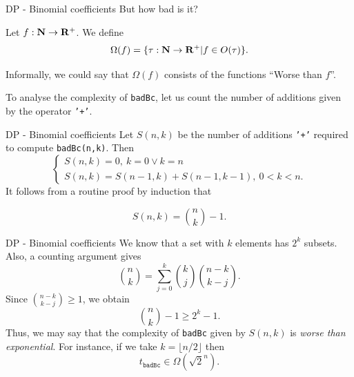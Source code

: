 \documentclass{beamer}
\begin{document}
%

\begin{frame}{DP - Binomial coefficients}
	But how bad is it?
	\begin{defn}
		Let $f : \mathbf{N} \to \mathbf{R}^+$. We define
		\[
			\Omega(f)= \{\tau : \mathbf{N} \to \mathbf{R}^+ | f \in O(\tau)\}.
		\]
	\end{defn}
	Informally, we could say that $\Omega(f)$ consists of the functions
	``Worse than $f$''.

	\bigskip
	To analyse the complexity of \texttt{badBc}, let us count the number of
	additions given by the operator \texttt{'+'}.
\end{frame}

%

\begin{frame}{DP - Binomial coefficients}
	Let $S(n,k)$ be the number of additions \texttt{'+'} required to compute
	\texttt{badBc(n,k)}. Then
	\[
		\begin{cases}
			S(n,k) = 0,\ k = 0 \lor k = n\\
			S(n,k) = S(n-1,k) + S(n-1,k-1),\ 0 < k < n.
		\end{cases}
	\]
	It follows from a routine proof by induction that
	\begin{prop}
		\[
			S(n,k) = \binom{n}{k} - 1.
		\]
	\end{prop}
\end{frame}

%

\begin{frame}{DP - Binomial coefficients}
	We know that a set with $k$ elements has $2^k$ subsets. Also, a counting
	argument gives
	\[
		\binom{n}{k} = \sum_{j= 0}^k \binom{k}{j} \binom{n-k}{k-j}.
	\]
	Since $\binom{n-k}{k-j} \geq 1$, we obtain
	\[
		\binom{n}{k} - 1 \geq 2^k - 1.
	\]
	Thus, we may say that the complexity of \texttt{badBc} given by $S(n,k)$ is
	\emph{worse than exponential}. For instance, if we take $k= \lfloor n/2
	\rfloor$ then 
	\[
		t_{\texttt{badBc}} \in \Omega(\sqrt{2}^n).
	\]
\end{frame}
\end{document}
